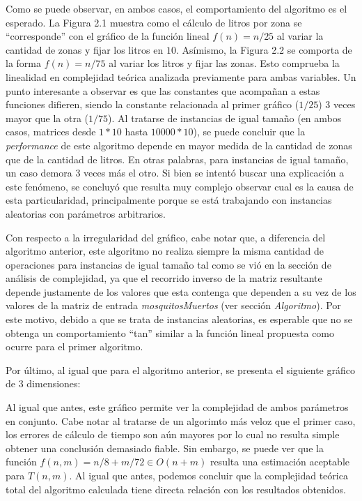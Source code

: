 \documentclass[a4paper,11pt] {article}
\begin{document}
Como se puede observar, en ambos casos, el comportamiento del algoritmo es el esperado. La Figura 2.1 muestra como el c\'alculo de litros por zona se ``corresponde'' con el gr\'afico de la funci\'on lineal $f(n) = n/25$ al variar la cantidad de zonas y fijar los litros en $10$. As\'imismo, la Figura 2.2 se comporta de la forma $f(n) = n/75$ al variar los litros y fijar las zonas. Esto comprueba la linealidad en complejidad te\'orica analizada previamente para ambas variables. Un punto interesante a observar es que las constantes que acompañan a estas funciones difieren, siendo la constante relacionada al primer gr\'afico ($1/25$) 3 veces mayor que la otra ($1/75$). Al tratarse de instancias de igual tamaño (en ambos casos, matrices desde $1*10$ hasta $10000*10$), se puede concluir que la \textit{performance} de este algoritmo depende en mayor medida de la cantidad de zonas que de la cantidad de litros. En otras palabras, para instancias de igual tamaño, un caso demora 3 veces m\'as el otro. Si bien se intentó buscar una explicación a este fenómeno, se concluyó que resulta muy complejo observar cual es la causa de esta particularidad, principalmente porque se está trabajando con instancias aleatorias con parámetros arbitrarios.

Con respecto a la irregularidad del gr\'afico, cabe notar que, a diferencia del algoritmo anterior, este algoritmo no realiza siempre la misma cantidad de operaciones para instancias de igual tamaño tal como se vi\'o en la secci\'on de an\'alisis de complejidad, ya que el recorrido inverso de la matriz resultante depende justamente de los valores que esta contenga que dependen a su vez de los valores de la matriz de entrada \textit{mosquitosMuertos} (ver secci\'on \textit{Algoritmo}). Por este motivo, debido a que se trata de instancias aleatorias, es esperable que no se obtenga un comportamiento ``tan'' similar a la funci\'on lineal propuesta como ocurre para el primer algoritmo.

Por \'ultimo, al igual que para el algoritmo anterior, se presenta el siguiente gr\'afico de 3 dimensiones:


Al igual que antes, este gr\'afico permite ver la complejidad de ambos par\'ametros en conjunto. Cabe notar al tratarse de un algorimto más veloz que el primer caso, los errores de cálculo de tiempo son aún mayores por lo cual no resulta simple obtener una conclusión demasiado fiable. Sin embargo, se puede ver que la función $f(n,m) = n/8 + m/72 \in O(n + m)$ resulta una estimación aceptable para $T(n,m)$. Al igual que antes, podemos concluir que la complejidad teórica total del algoritmo calculada tiene directa relación con los resultados obtenidos.
\end{document}
